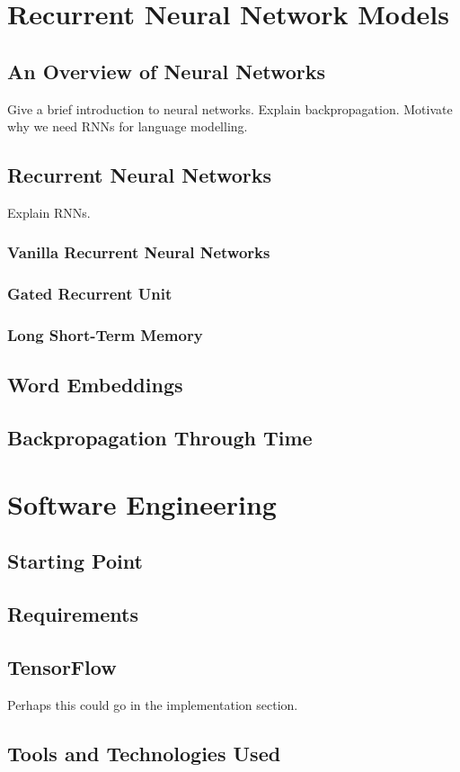\documentclass[a4paper, 12pt]{report}
\begin{document}
\section{Recurrent Neural Network Models}
\subsection{An Overview of Neural Networks}
Give a brief introduction to neural networks. Explain backpropagation. Motivate why we need RNNs for language modelling.
\subsection{Recurrent Neural Networks}
Explain RNNs.
\subsubsection{Vanilla Recurrent Neural Networks}
\subsubsection{Gated Recurrent Unit}
\subsubsection{Long Short-Term Memory}
\subsection{Word Embeddings}
\subsection{Backpropagation Through Time}
\section{Software Engineering}
\subsection{Starting Point}
\subsection{Requirements}
\subsection{TensorFlow}
Perhaps this could go in the implementation section.
\subsection{Tools and Technologies Used}
\end{document}
